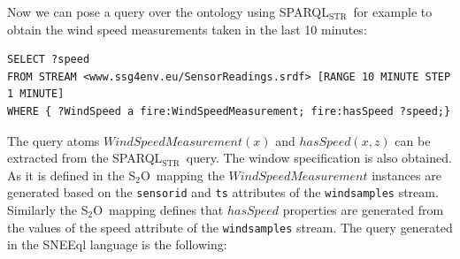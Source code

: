 \documentclass[runningheads,a4paper]{llncs}
\newcommand{\subscript}[1]{\ensuremath{_{\textrm{#1}}}}
\newcommand{\stwoo}{\textsf{S\subscript{2}O}}
\newcommand{\sparqlstr}{SPARQL\subscript{STR}}
\begin{document}
Now we can pose a query over the ontology using \sparqlstr\, for example to obtain the wind speed measurements taken in the last 10 minutes:
%
\begin{lstlisting}[style=SPARQLSTRStyle,language=SPARQLSTR,frame=none]
SELECT ?speed
FROM STREAM <www.ssg4env.eu/SensorReadings.srdf> [RANGE 10 MINUTE STEP 1 MINUTE]
WHERE { ?WindSpeed a fire:WindSpeedMeasurement; fire:hasSpeed ?speed;}
\end{lstlisting}
%
The query atoms $WindSpeedMeasurement(x)$ and $hasSpeed(x,z)$ can be extracted from the \sparqlstr\ query. The window specification %
is also obtained. As it is defined in the \stwoo\ mapping the $WindSpeedMeasurement$ instances are generated based on the \texttt{sensorid} and \texttt{ts} attributes of the \texttt{windsamples} stream.
Similarly the \stwoo\ mapping defines that $hasSpeed$ properties are generated from the values of the speed attribute of the \texttt{windsamples} stream. 
The query generated in the SNEEql language is the following:
\end{document}
